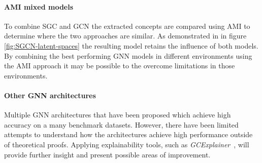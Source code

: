 \paragraph{AMI mixed models}
To combine SGC and GCN the extracted concepts are compared using AMI to determine where the two approaches are similar.
As demonstrated in  in figure \ref{fig:SGCN-latent-spaces} the resulting model retains the influence of both models.
By combining the best performing GNN models in different environments using the AMI approach it may be possible to the overcome limitations in those environments.

\paragraph{Other GNN architectures}
Multiple GNN architectures that have been proposed which achieve high accuracy on a many benchmark datasets.
However, there have been limited attempts to understand how the architectures achieve high performance outside of theoretical proofs.
Applying explainability tools, such as \textit{GCExplainer}~\cite{magister2021gcexplainer}, will provide further insight and present possible areas of improvement.
